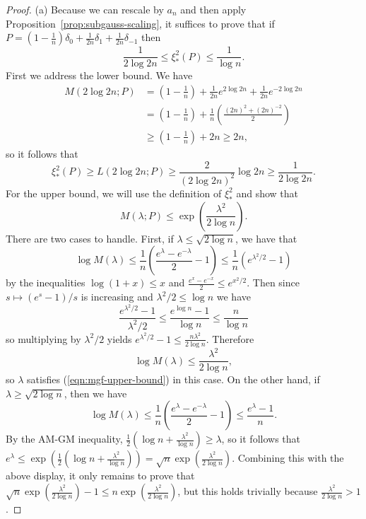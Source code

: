 \documentclass[10pt,a4paper]{amsart}
\begin{document}
\begin{proof}
    (a) Because we can rescale by $a_n$ and then apply Proposition~\ref{prop:subgauss-scaling}, it suffices to prove that if  $P = (1 - \frac1n)\delta_0 + \frac{1}{2n}\delta_{1} + \frac{1}{2n} \delta_{-1}$ then 
    \[
     \frac{1}{2 \log 2n}\leq \xi_*^2(P) \leq \frac{1}{\log n}.
    \]
    First we address the lower bound.  We have \begin{align*}
        M(2 \log 2n; P) &= \left(1 - \frac1n\right) + \frac{1}{2n}e^{2 \log 2n} + \frac{1}{2n}e^{-2 \log 2n} \\
        &= \left(1 - \frac1n\right) + \frac1n\left(\frac{(2n)^2 +(2n)^{-2}}{2}\right) \\
        &\geq \left(1 - \frac1n\right)  + 2n \geq 2n,
    \end{align*}
    so it follows that 
    \[
    \xi_*^2(P) \geq L(2 \log 2n; P) \geq \frac{2}{(2 \log 2n)^2}\log 2n \geq \frac{1}{2\log 2n}.
    \]
    For the upper bound, we will use the definition of $\xi_*^2$ and show that 
    \begin{equation}
        M(\lambda; P) \leq \exp\left(\frac{\lambda^2}{2\log n}\right).
    \label{eqn:mgf-upper-bound}
    \end{equation}
    There are two cases to handle. First, if $\lambda \leq \sqrt{2\log n}$, we have that 
    \[
    \log M(\lambda) \leq \frac{1}{n}\left(\frac{e^{\lambda} - e^{-\lambda}}{2} - 1\right) \leq\frac{1}{n}\left(e^{\lambda^2/2} - 1\right)
    \]
    by the inequalities $\log(1+x)\leq x$ and $\frac{e^x - e^{-x}}{2} \leq e^{x^2/2}$. Then since $s \mapsto (e^s - 1)/s$ is increasing and $\lambda^2/2 \leq \log n$ we have 
    \[
\frac{e^{\lambda^2/2}-1}{\lambda^2/2} \leq  \frac{e^{\log n} - 1}{\log n} \leq \frac{n}{\log n}
    \]
    so multiplying by $\lambda^2/2$ yields $e^{\lambda^2/2} - 1 \leq \frac{n\lambda^2}{2\log n}$. Therefore
    \[
    \log M(\lambda) \leq \frac{\lambda^2}{2 \log n},
    \]
    so $\lambda$ satisfies (\ref{eqn:mgf-upper-bound}) in this case. On the other hand, if $\lambda \geq \sqrt{2 \log n}$, then we have 
    \[
    \log M(\lambda) \leq \frac{1}{n}\left(\frac{e^{\lambda} - e^{-\lambda}}{2} - 1\right)  \leq \frac{e^{\lambda} - 1}{n}.
    \]
    By the AM-GM inequality, $\frac12(\log n + \frac{\lambda^2}{\log n})\geq \lambda$, so it follows that $e^{\lambda } \leq \exp(\frac12(\log n + \frac{\lambda^2}{\log n})) = \sqrt n \exp(\frac{\lambda^2}{2\log n})$. Combining this with the above display, it only remains to prove that $\sqrt n\exp(\frac{\lambda^2}{2\log n}) - 1  \leq n\exp(\frac{\lambda^2}{2\log n})$, but this holds trivially because $\frac{\lambda^2}{2\log n} > 1$. 

\end{proof}
\end{document}

